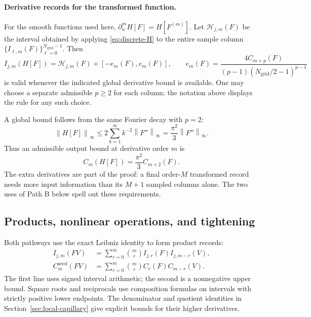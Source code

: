 \documentclass[11pt]{article}
\numberwithin{equation}{section}
\newcommand{\norm}[1]{\left\|#1\right\|_{\infty}}
\newcommand{\Ngrid}{N_{\mathrm{grid}}}
\begin{document}
\paragraph{Derivative records for the transformed function.}
For the smooth functions used here, $\partial_u^mH[F]=H[F^{(m)}]$.
Let $\mathcal H_{j,m}(F)$ be the interval obtained by applying
\eqref{eq:discrete-H} to the entire sample column
$\{I_{\ell,m}(F)\}_{\ell=0}^{\Ngrid-1}$. Then
\begin{equation}
 I_{j,m}(H[F])=
 \mathcal H_{j,m}(F)+[-e_m(F),e_m(F)],\qquad
 e_m(F)=\frac{4C_{m+p}(F)}{(p-1)(\Ngrid/2-1)^{p-1}}
 \label{eq:path-b-record}
\end{equation}
is valid whenever the indicated global derivative bound is available.
One may choose a separate admissible $p\geq2$ for each column; the notation
above displays the rule for any such choice.

A global bound follows from the same Fourier decay with $p=2$:
\begin{equation}
 \norm{H[F]}\leq2\sum_{k=1}^{\infty}k^{-2}\norm{F''}
 =\frac{\pi^2}{3}\norm{F''}.
 \label{eq:H-global}
\end{equation}
Thus an admissible output bound at derivative order $m$ is
\begin{equation}
 C_m(H[F])=\frac{\pi^2}{3}C_{m+2}(F).
 \label{eq:H-global-derivatives}
\end{equation}
The extra derivatives are part of the proof: a final order-$M$ transformed
record needs more input information than its $M+1$ sampled columns alone.
The two uses of Path B below spell out these requirements.

\subsection{Products, nonlinear operations, and tightening}
\label{sec:calculus}

Both pathways use the exact Leibniz identity to form product records:
\begin{align}
 I_{j,m}(FV)&=\sum_{r=0}^{m}\binom mr
 I_{j,r}(F)I_{j,m-r}(V),\label{eq:local-product}\\
 C_m^{\mathrm{seed}}(FV)&=\sum_{r=0}^{m}\binom mr
 C_r(F)C_{m-r}(V).
 \label{eq:global-product}
\end{align}
The first line uses signed interval arithmetic; the second is a
nonnegative upper bound. Square roots and reciprocals use composition
formulas on intervals with strictly positive lower endpoints. The denominator
and quotient identities in Section~\ref{sec:local-capillary} give explicit
bounds for their higher derivatives.
\end{document}
